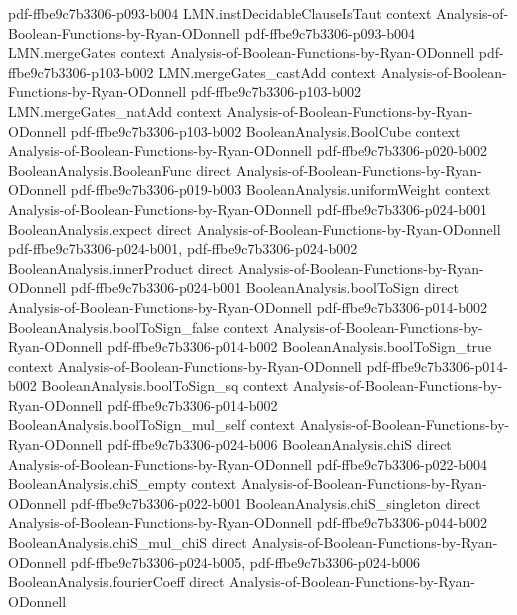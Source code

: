 \begin{lemma}
  {pdf-ffbe9c7b3306-p093-b004}
\proofstep
  {LMN.instDecidableClauseIsTaut}
  {context}
  {Analysis-of-Boolean-Functions-by-Ryan-ODonnell}
  {pdf-ffbe9c7b3306-p093-b004}
\proofstep
  {LMN.mergeGates}
  {context}
  {Analysis-of-Boolean-Functions-by-Ryan-ODonnell}
  {pdf-ffbe9c7b3306-p103-b002}
\proofstep
  {LMN.mergeGates_castAdd}
  {context}
  {Analysis-of-Boolean-Functions-by-Ryan-ODonnell}
  {pdf-ffbe9c7b3306-p103-b002}
\proofstep
  {LMN.mergeGates_natAdd}
  {context}
  {Analysis-of-Boolean-Functions-by-Ryan-ODonnell}
  {pdf-ffbe9c7b3306-p103-b002}
\proofstep
  {BooleanAnalysis.BoolCube}
  {context}
  {Analysis-of-Boolean-Functions-by-Ryan-ODonnell}
  {pdf-ffbe9c7b3306-p020-b002}
\proofstep
  {BooleanAnalysis.BooleanFunc}
  {direct}
  {Analysis-of-Boolean-Functions-by-Ryan-ODonnell}
  {pdf-ffbe9c7b3306-p019-b003}
\proofstep
  {BooleanAnalysis.uniformWeight}
  {context}
  {Analysis-of-Boolean-Functions-by-Ryan-ODonnell}
  {pdf-ffbe9c7b3306-p024-b001}
\proofstep
  {BooleanAnalysis.expect}
  {direct}
  {Analysis-of-Boolean-Functions-by-Ryan-ODonnell}
  {pdf-ffbe9c7b3306-p024-b001,
    pdf-ffbe9c7b3306-p024-b002}
\proofstep
  {BooleanAnalysis.innerProduct}
  {direct}
  {Analysis-of-Boolean-Functions-by-Ryan-ODonnell}
  {pdf-ffbe9c7b3306-p024-b001}
\proofstep
  {BooleanAnalysis.boolToSign}
  {direct}
  {Analysis-of-Boolean-Functions-by-Ryan-ODonnell}
  {pdf-ffbe9c7b3306-p014-b002}
\proofstep
  {BooleanAnalysis.boolToSign_false}
  {context}
  {Analysis-of-Boolean-Functions-by-Ryan-ODonnell}
  {pdf-ffbe9c7b3306-p014-b002}
\proofstep
  {BooleanAnalysis.boolToSign_true}
  {context}
  {Analysis-of-Boolean-Functions-by-Ryan-ODonnell}
  {pdf-ffbe9c7b3306-p014-b002}
\proofstep
  {BooleanAnalysis.boolToSign_sq}
  {context}
  {Analysis-of-Boolean-Functions-by-Ryan-ODonnell}
  {pdf-ffbe9c7b3306-p014-b002}
\proofstep
  {BooleanAnalysis.boolToSign_mul_self}
  {context}
  {Analysis-of-Boolean-Functions-by-Ryan-ODonnell}
  {pdf-ffbe9c7b3306-p024-b006}
\proofstep
  {BooleanAnalysis.chiS}
  {direct}
  {Analysis-of-Boolean-Functions-by-Ryan-ODonnell}
  {pdf-ffbe9c7b3306-p022-b004}
\proofstep
  {BooleanAnalysis.chiS_empty}
  {context}
  {Analysis-of-Boolean-Functions-by-Ryan-ODonnell}
  {pdf-ffbe9c7b3306-p022-b001}
\proofstep
  {BooleanAnalysis.chiS_singleton}
  {direct}
  {Analysis-of-Boolean-Functions-by-Ryan-ODonnell}
  {pdf-ffbe9c7b3306-p044-b002}
\proofstep
  {BooleanAnalysis.chiS_mul_chiS}
  {direct}
  {Analysis-of-Boolean-Functions-by-Ryan-ODonnell}
  {pdf-ffbe9c7b3306-p024-b005,
    pdf-ffbe9c7b3306-p024-b006}
\proofstep
  {BooleanAnalysis.fourierCoeff}
  {direct}
  {Analysis-of-Boolean-Functions-by-Ryan-ODonnell}

\end{lemma}
